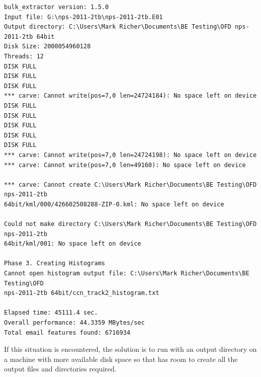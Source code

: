 \documentclass[11pt]{article} %
\begin{document}
\begingroup
\footnotesize
\begin{Verbatim}
bulk_extractor version: 1.5.0
Input file: G:\nps-2011-2tb\nps-2011-2tb.E01
Output directory: C:\Users\Mark Richer\Documents\BE Testing\OFD nps-2011-2tb 64bit
Disk Size: 2000054960128
Threads: 12
DISK FULL
DISK FULL
DISK FULL
*** carve: Cannot write(pos=7,0 len=24724184): No space left on device
DISK FULL
DISK FULL
DISK FULL
DISK FULL
DISK FULL
*** carve: Cannot write(pos=7,0 len=24724198): No space left on device
*** carve: Cannot write(pos=7,0 len=49160): No space left on device

*** carve: Cannot create C:\Users\Mark Richer\Documents\BE Testing\OFD nps-2011-2tb
64bit/kml/000/426602508288-ZIP-0.kml: No space left on device

Could not make directory C:\Users\Mark Richer\Documents\BE Testing\OFD nps-2011-2tb
64bit/kml/001: No space left on device

Phase 3. Creating Histograms
Cannot open histogram output file: C:\Users\Mark Richer\Documents\BE Testing\OFD
nps-2011-2tb 64bit/ccn_track2_histogram.txt

Elapsed time: 45111.4 sec.
Overall performance: 44.3359 MBytes/sec
Total email features found: 6716934
\end{Verbatim}
\endgroup
If this situation is encountered, the solution is to run \bulk with an output directory on a machine with more available disk space so that \bulk has room to create all the output files and directories required. 
\end{document}
